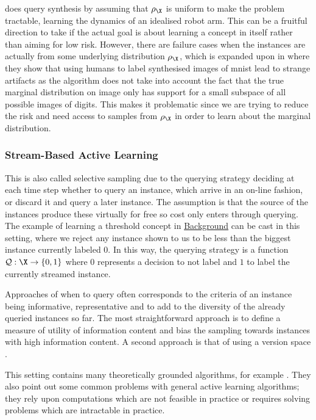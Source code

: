 \cite{cohn96_activ_learn_with_statis_model} does query synthesis by assuming
that \(\rho_{\X}\) is uniform to make the problem tractable, learning the
dynamics of an idealised robot arm. This can be a fruitful direction to take if
the actual goal is about learning a concept in itself rather than aiming for low
risk. However, there are failure cases when the instances are actually from some
underlying distribution \(\rho_{\X}\), which is expanded upon in
\cite{baum92_query} where they show that using humans to label synthesised
images of mnist lead to strange artifacts as the algorithm does not take into
account the fact that the true marginal distribution on image only has support
for a small subspace of all possible images of digits. This makes it problematic
since we are trying to reduce the risk and need access to samples from
\(\rho_{\X}\) in order to learn about the marginal distribution.

\subsubsection{Stream-Based Active Learning} This is also called selective sampling
\cite{cohn94_improv_gener_with_activ_learn} due to the querying strategy
deciding at each time step whether to query an instance, which arrive in an
on-line fashion, or discard it and query a later instance. The assumption is
that the source of the instances produce these virtually for free so cost only
enters through querying. The example of learning a threshold concept in
\hyperref[sec:background]{Background} can be cast in this setting, where we reject any instance
shown to us to be less than the biggest instance currently labeled \(0\). In
this way, the querying strategy is a function \(\querstrat: \X \to \{0, 1\}\)
where \(0\) represents a decision to not label and \(1\) to label the currently
streamed instance.

Approaches of when to query often corresponds to the criteria of an instance
being informative, representative and to add to the diversity of the already
queried instances so far. The most straightforward approach is to define a
measure of utility of information content and bias the sampling towards
instances with high information content. A second approach is that of using a
version space \cite{tong01_suppor_vector_machin_activ_learn}.

This setting contains many theoretically grounded algorithms, for example
\cite{dasgupta08}. They also point out some common problems with general active
learning algorithms; they rely upon computations which are not feasible in
practice or requires solving problems which are intractable in practice.

